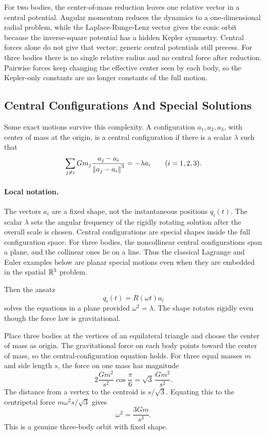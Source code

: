 \begin{remark}
For two bodies, the center-of-mass reduction leaves one relative vector in a
central potential. Angular momentum reduces the dynamics to a one-dimensional
radial problem, while the Laplace-Runge-Lenz vector gives the conic orbit
because the inverse-square potential has a hidden Kepler symmetry. Central
forces alone do not give that vector; generic central potentials still precess.
For three bodies there is no single relative radius and no central force after
reduction. Pairwise forces keep changing the effective center seen by each
body, so the Kepler-only constants are no longer constants of the full motion.
\end{remark}

\subsection{Central Configurations And Special Solutions}
\label{subsec:central-configurations}

Some exact motions survive this complexity. A configuration
\(a_1,a_2,a_3\), with center of mass at the origin, is a central configuration
if there is a scalar \(\lambda\) such that
\[
  \sum_{j\neq i}
  Gm_j\frac{a_j-a_i}{\left\lVert a_j-a_i\right\rVert^3}
  =
  -\lambda a_i
  \qquad
  (i=1,2,3).
\]

\paragraph{Local notation.}
The vectors \(a_i\) are a fixed shape, not the instantaneous positions
\(q_i(t)\).  The scalar \(\lambda\) sets the angular frequency of the rigidly
rotating solution after the overall scale is chosen.  Central configurations
are special shapes inside the full configuration space.
For three bodies, the noncollinear central configurations span a plane, and the
collinear ones lie on a line.  Thus the classical Lagrange and Euler examples
below are planar special motions even when they are embedded in the spatial
\(\mathbb{R}^3\) problem.

Then the ansatz
\[
  q_i(t)=R(\omega t)a_i
\]
solves the equations in a plane provided \(\omega^2=\lambda\). The shape
rotates rigidly even though the force law is gravitational.

\begin{example}
Place three bodies at the vertices of an equilateral triangle and choose the
center of mass as origin. The gravitational force on each body points toward
the center of mass, so the central-configuration equation holds. For three
equal masses \(m\) and side length \(s\), the force on one mass has magnitude
\[
  2\frac{Gm^2}{s^2}\cos\frac{\pi}{6}
  =
  \sqrt3\,\frac{Gm^2}{s^2}.
\]
The distance from a vertex to the centroid is \(s/\sqrt3\). Equating this to
the centripetal force \(m\omega^2s/\sqrt3\) gives
\[
  \omega^2=\frac{3Gm}{s^3}.
\]
This is a genuine three-body orbit with fixed shape.
\end{example}

